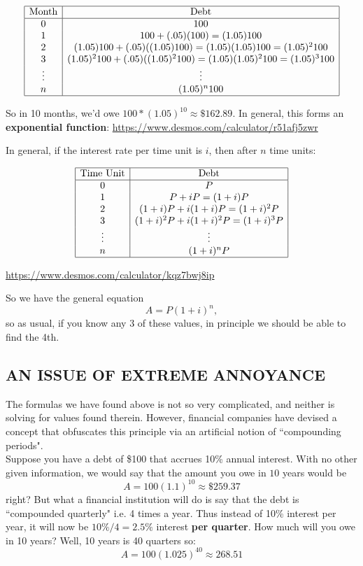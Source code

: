 \documentclass[10pt]{article}
\theoremstyle{definition}
\begin{document}
$$\begin{array}{|c|c|}
\hline
\text{Month} & \text{Debt}\\
\hline
0 & 100\\
1& 100+(.05)(100)=(1.05)100\\
2& (1.05)100+(.05)((1.05)100)=(1.05)(1.05)100=(1.05)^2 100\\
3 & (1.05)^2100+(.05)((1.05)^2100)=(1.05)(1.05)^2 100=(1.05)^3 100\\
\vdots & \vdots\\
n & (1.05)^n100\\
\hline
\end{array}$$

So in 10 months, we'd owe $100*(1.05)^10\approx \$162.89$.  In general, this forms an \textbf{exponential function}: \url{https://www.desmos.com/calculator/r51afj5zwr}


In general, if the interest rate per time unit is $i$, then after $n$ time units:


$$\begin{array}{|c|c|}
\hline
\text{Time Unit} & \text{Debt}\\
\hline
0 & P\\
1& P+iP=(1+i)P\\
2& (1+i)P+i(1+i)P=(1+i)^2P\\
3 & (1+i)^2P+i(1+i)^2P=(1+i)^3P\\
\vdots & \vdots\\
n & (1+i)^nP\\
\hline
\end{array}$$

\url{https://www.desmos.com/calculator/kqz7bwj8ip}

So we have the general equation $$A=P(1+i)^n,$$ so as usual, if you know any 3 of these values, in principle we should be able to find the 4th.\\

\subsection{AN ISSUE OF EXTREME ANNOYANCE}

The formulas we have found above is not so very complicated, and neither is solving for values found therein.  However, financial companies have devised a concept that obfuscates this principle via an artificial notion of ``compounding periods".\\

Suppose you have a debt of \$100 that accrues 10\% annual interest.  With no other given information, we would say that the amount you owe in $10$ years would be $$A=100(1.1)^{10}\approx \$259.37$$  right?  But what a financial institution will do is say that the debt is ``compounded quarterly" i.e. 4 times a year.  Thus instead of 10\% interest per year, it will now be $10\%/4=2.5\%$ interest {\bf per quarter}.  How much will you owe in 10 years?  Well, 10 years is 40 quarters so: $$A=100(1.025)^{40}\approx 268.51$$
\end{document}
